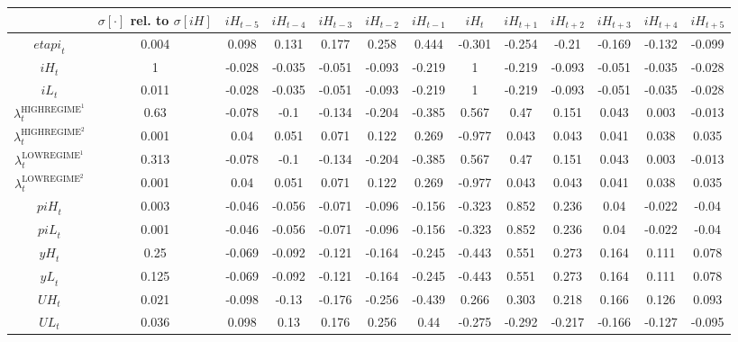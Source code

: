 \begin{tabular}{c|c|c|c|c|c|c|c|c|c|c|c|c|}
  & $\sigma[\cdot]$ rel. to $\sigma[{i\!H}]$ & ${i\!H}_{t-5}$ & ${i\!H}_{t-4}$ & ${i\!H}_{t-3}$ & ${i\!H}_{t-2}$ & ${i\!H}_{t-1}$ & ${i\!H}_{t}$ & ${i\!H}_{t+1}$ & ${i\!H}_{t+2}$ & ${i\!H}_{t+3}$ & ${i\!H}_{t+4}$ & ${i\!H}_{t+5}$\\
\hline
${e\!t\!a\!p\!i}_{t}$ & 0.004 & 0.098 & 0.131 & 0.177 & 0.258 & 0.444 & -0.301 & -0.254 & -0.21 & -0.169 & -0.132 & -0.099 \\
${i\!H}_{t}$ & 1 & -0.028 & -0.035 & -0.051 & -0.093 & -0.219 & 1 & -0.219 & -0.093 & -0.051 & -0.035 & -0.028 \\
${i\!L}_{t}$ & 0.011 & -0.028 & -0.035 & -0.051 & -0.093 & -0.219 & 1 & -0.219 & -0.093 & -0.051 & -0.035 & -0.028 \\
$\lambda^{\mathrm{HIGHREGIME}^{\mathrm{1}}}_{t}$ & 0.63 & -0.078 & -0.1 & -0.134 & -0.204 & -0.385 & 0.567 & 0.47 & 0.151 & 0.043 & 0.003 & -0.013 \\
$\lambda^{\mathrm{HIGHREGIME}^{\mathrm{2}}}_{t}$ & 0.001 & 0.04 & 0.051 & 0.071 & 0.122 & 0.269 & -0.977 & 0.043 & 0.043 & 0.041 & 0.038 & 0.035 \\
$\lambda^{\mathrm{LOWREGIME}^{\mathrm{1}}}_{t}$ & 0.313 & -0.078 & -0.1 & -0.134 & -0.204 & -0.385 & 0.567 & 0.47 & 0.151 & 0.043 & 0.003 & -0.013 \\
$\lambda^{\mathrm{LOWREGIME}^{\mathrm{2}}}_{t}$ & 0.001 & 0.04 & 0.051 & 0.071 & 0.122 & 0.269 & -0.977 & 0.043 & 0.043 & 0.041 & 0.038 & 0.035 \\
${p\!i\!H}_{t}$ & 0.003 & -0.046 & -0.056 & -0.071 & -0.096 & -0.156 & -0.323 & 0.852 & 0.236 & 0.04 & -0.022 & -0.04 \\
${p\!i\!L}_{t}$ & 0.001 & -0.046 & -0.056 & -0.071 & -0.096 & -0.156 & -0.323 & 0.852 & 0.236 & 0.04 & -0.022 & -0.04 \\
${y\!H}_{t}$ & 0.25 & -0.069 & -0.092 & -0.121 & -0.164 & -0.245 & -0.443 & 0.551 & 0.273 & 0.164 & 0.111 & 0.078 \\
${y\!L}_{t}$ & 0.125 & -0.069 & -0.092 & -0.121 & -0.164 & -0.245 & -0.443 & 0.551 & 0.273 & 0.164 & 0.111 & 0.078 \\
${U\!H}_{t}$ & 0.021 & -0.098 & -0.13 & -0.176 & -0.256 & -0.439 & 0.266 & 0.303 & 0.218 & 0.166 & 0.126 & 0.093 \\
${U\!L}_{t}$ & 0.036 & 0.098 & 0.13 & 0.176 & 0.256 & 0.44 & -0.275 & -0.292 & -0.217 & -0.166 & -0.127 & -0.095 \\
\hline
\end{tabular}


